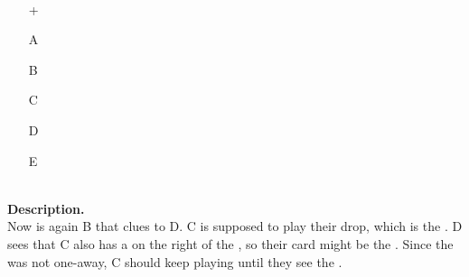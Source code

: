 \begin{example}	\hfill \\
	\begin{minipage}{0.45\textwidth}
		\begin{itemize}
			\item[\Large +]      
			\item[\Large A]    
			\item[\Large B]    
			\item[\Large C]    
			\item[\Large D]    
			\item[\Large E]    
		\end{itemize}
	\end{minipage}%
	\begin{minipage}{0.55\textwidth}
		\hfill \\
		
		\textbf{Description.} \\
		
		Now is again B that clues  to D. C is supposed to play their drop, which is the . D sees that C also has a  on the right of the , so their card might be the . Since the  was not one-away, C should keep playing until they see the .
	\end{minipage}
\end{example} \vspace{0.15 cm}

